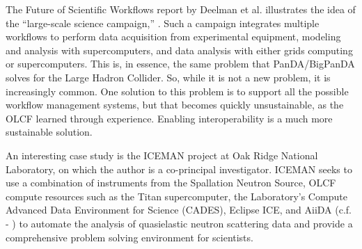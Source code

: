 The Future of Scientific Workflows report by Deelman et al. illustrates
the idea of the ``large-scale science campaign,'' \cite{deelman_future_2015}.
Such a campaign integrates multiple workflows to perform data
acquisition from experimental equipment, modeling and analysis with
supercomputers, and data analysis with either grids computing or
supercomputers. This is, in essence, the same problem that
PanDA/BigPanDA solves for the Large Hadron Collider. So, while it is not
a new problem, it is increasingly common. One solution to this problem
is to support all the possible workflow management systems, but that
becomes quickly unsustainable, as the OLCF learned through experience.
Enabling interoperability is a much more sustainable solution.

An interesting case study is the ICEMAN project at Oak Ridge National
Laboratory, on which the author is a co-principal investigator. ICEMAN
seeks to use a combination of instruments from the Spallation Neutron
Source, OLCF compute resources such as the Titan supercomputer, the
Laboratory's Compute Advanced Data Environment for Science (CADES),
Eclipse ICE, and AiiDA (c.f. - \cite{pizzi_aiida:_2016}) to automate the
analysis of quasielastic neutron scattering data and provide a
comprehensive problem solving environment for scientists.

